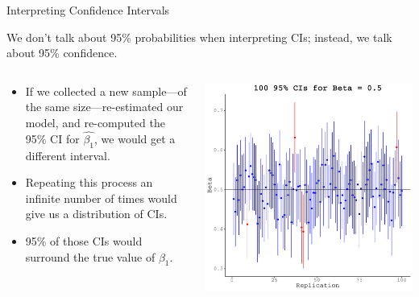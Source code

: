 \documentclass[10pt]{beamer}\usepackage[]{graphicx}\usepackage[]{color}
\makeatletter
\def\maxwidth{ %
  \ifdim\Gin@nat@width>\linewidth
    \linewidth
  \else
    \Gin@nat@width
  \fi
}
\newenvironment{knitrout}{}{} %
\makeatother
\begin{document}
\watermarkoff %

\begin{frame}{Interpreting Confidence Intervals}
  
  We don't talk about 95\% probabilities when interpreting CIs; instead, we 
  talk about 95\% confidence.
  \vc
  \begin{columns}
    \begin{column}{0.5\textwidth}
      
      \begin{itemize}
      \item If we collected a new sample---of the same size---re-estimated our 
        model, and re-computed the 95\% CI for $\hat{\beta_1}$, we would get a 
        different interval.
        \vc
      \item Repeating this process an infinite number of times would give us a 
        distribution of CIs.
        \vc
      \item 95\% of those CIs would surround the true value of $\beta_1$.
      \end{itemize}
      
    \end{column}
    \begin{column}{0.5\textwidth}
      
\begin{knitrout}\footnotesize
{}\color{fgcolor}

{\centering \includegraphics[width=\maxwidth]{figure/unnamed-chunk-18-1} 

}


\end{knitrout}

\end{column}
\end{columns}

\end{frame}
\end{document}
